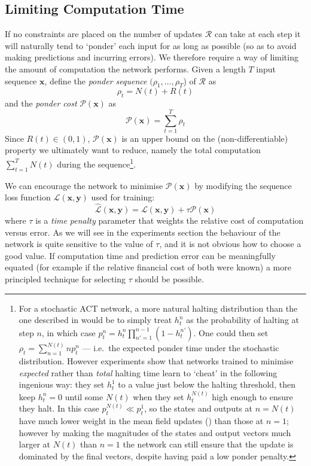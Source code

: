 \documentclass[10pt]{article}
\newcommand{\vect}[1]{\mathbf{#1}}
\newcommand{\rnn}{\mathcal{R}}
\newcommand{\inseq}{\vect{x}}
\newcommand{\outseq}{\vect{y}}
\newcommand{\loss}{\mathcal{L}}
\newcommand{\tloss}{\mathcal{P}}
\newcommand{\ie}{i.e.\ }
\newcommand{\elabel}[1]{\label{eq:#1}}
\newcommand{\eref}[1]{\Cref{eq:#1}}
\begin{document}
\subsection{Limiting Computation Time}
If no constraints are placed on the number of updates $\rnn$ can take at each step it will naturally tend to `ponder' each input for as long as possible (so as to avoid making predictions and incurring errors).
We therefore require a way of limiting the amount of computation the network performs.
Given a length $T$ input sequence $\inseq$, define the \emph{ponder sequence} $(\rho_1,\dots,\rho_T$) of $\rnn$ as
\begin{equation}
\rho_t = N(t) + R(t)
\end{equation}
and the \emph{ponder cost} $\tloss(\inseq)$ as
\begin{equation}
\tloss(\inseq) = \sum_{t=1}^T \rho_t
\end{equation} 
Since $R(t) \in (0,1)$, $\tloss(\inseq) $ is an upper bound on the (non-differentiable) property we ultimately want to reduce, namely the total computation $\sum_{t=1}^T N(t)$ during the sequence\footnote{For a stochastic ACT network, a more natural halting distribution than the one described in \eref{halting_prob,eq:epsilon,eq:remainder} would be to simply treat $h^n_t$ as the probability of halting at step $n$, in which case $p^n_t = h^n_t\prod_{n'=1}^{n-1}(1-h^{n'}_t)$. One could then set $\rho_t = \sum_{n=1}^{N(t)} n p^n_t$ --- \ie the expected ponder time under the stochastic distribution. However experiments show that networks trained to minimise \emph{expected} rather than \emph{total} halting time learn to `cheat' in the following ingenious way: they set $h^1_t$ to a value just below the halting threshold, then keep $h^n_t = 0$ until some $N(t)$ when they set $h^{N(t)}_t$ high enough to ensure they halt. In this case $p^{N(t)}_t \ll p^1_t$, so the states and outputs at $n=N(t)$ have much lower weight in the mean field updates (\eref{mean_field}) than those at $n=1$; however by making the magnitudes of the states and output vectors much larger at $N(t)$ than $n=1$ the network can still ensure that the update is dominated by the final vectors, despite having paid a low ponder penalty.}.

We can encourage the network to minimise $\tloss(\inseq)$ by modifying the sequence loss function $\loss(\inseq,\outseq)$ used for training:
\begin{equation}\elabel{act_loss}
\hat{\loss}(\inseq,\outseq) =\loss{(\inseq,\outseq)} + \tau \tloss(\inseq)
\end{equation}
where $\tau$ is a \emph{time penalty} parameter that weights the relative cost of computation versus error.
As we will see in the experiments section the behaviour of the network is quite sensitive to the value of $\tau$, and it is not obvious how to choose a good value.
If computation time and prediction error can be meaningfully equated (for example if the relative financial cost of both were known) a more principled technique for selecting $\tau$ should be possible.
\end{document}
